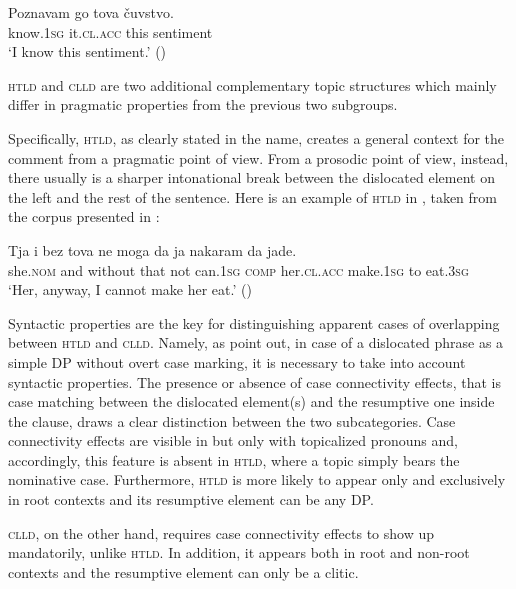 \documentclass[output=paper,
colorlinks,
citecolor=brown,
newtxmath
]{langscibook}
\begin{document}

\ea\label{ex:zivojinovic:7}
\gll Poznavam go         tova čuvstvo.\\
     know.\textsc{1sg} it.\textsc{cl.acc} this sentiment  \\
\glt `I know this sentiment.'
\hfill ()
\z

\noindent \textsc{htld} and \textsc{clld} are two additional complementary topic structures which mainly differ in pragmatic properties from the previous two subgroups.

Specifically, \textsc{htld}, as clearly stated in the name, creates a general context for the comment from a pragmatic point of view. From a prosodic point of view, instead, there usually is a sharper intonational break between the dislocated element on the left and the rest of the sentence. Here is an example of \textsc{htld} in , taken from the corpus presented in \citet{Dzonova2004}:


\ea\label{ex:zivojinovic:8}
\gll Tja	 i	 bez     tova ne  moga	  da ja	        nakaram da jade.\\
     she.\textsc{nom} and without that not can.\textsc{1sg} \textsc{comp} her.\textsc{cl.acc} make.\textsc{1sg} to eat.\textsc{3sg}  \\
\glt `Her, anyway, I cannot make her eat.’ \hfill ()
\z

\noindent Syntactic properties are the key for distinguishing apparent cases of overlapping between \textsc{htld} and \textsc{clld}. Namely, as \citet{Cinque.Krapova2008} point out, in case of a dislocated phrase as a simple DP without overt case marking, it is necessary to take into account syntactic properties. The presence or absence of case connectivity effects, that is case matching between the dislocated element(s) and the resumptive one inside the clause, draws a clear distinction between the two subcategories. Case connectivity effects are visible in  but only with topicalized pronouns and, accordingly, this feature is absent in \textsc{htld}, where a topic simply bears the nominative case. Furthermore, \textsc{htld} is more likely to appear only and exclusively in root contexts and its resumptive element can be any DP.

\textsc{clld}, on the other hand, requires case connectivity effects to show up mandatorily, unlike \textsc{htld}. In addition, it appears both in root and non-root contexts and the resumptive element can only be a clitic.
\end{document}
